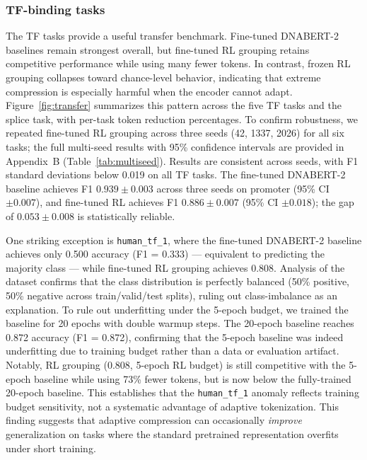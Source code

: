 \documentclass[sigconf,screen]{acmart}
\newcommand{\dnabert}{DNABERT-2\xspace}
\begin{document}
\subsubsection{TF-binding tasks}
The TF tasks provide a useful transfer benchmark. Fine-tuned \dnabert baselines remain strongest overall, but fine-tuned RL grouping retains competitive performance while using many fewer tokens. In contrast, frozen RL grouping collapses toward chance-level behavior, indicating that extreme compression is especially harmful when the encoder cannot adapt. Figure~\ref{fig:transfer} summarizes this pattern across the five TF tasks and the splice task, with per-task token reduction percentages. To confirm robustness, we repeated fine-tuned RL grouping across three seeds (42, 1337, 2026) for all six tasks; the full multi-seed results with 95\% confidence intervals are provided in Appendix~B (Table~\ref{tab:multiseed}). Results are consistent across seeds, with F1 standard deviations below 0.019 on all TF tasks. The fine-tuned \dnabert baseline achieves F1 $0.939\pm0.003$ across three seeds on promoter (95\% CI $\pm0.007$), and fine-tuned RL achieves F1 $0.886\pm0.007$ (95\% CI $\pm0.018$); the gap of $0.053\pm0.008$ is statistically reliable.

One striking exception is \texttt{human\_tf\_1}, where the fine-tuned \dnabert baseline achieves only 0.500 accuracy (F1 = 0.333) — equivalent to predicting the majority class — while fine-tuned RL grouping achieves 0.808. Analysis of the dataset confirms that the class distribution is perfectly balanced (50\% positive, 50\% negative across train/valid/test splits), ruling out class-imbalance as an explanation. To rule out underfitting under the 5-epoch budget, we trained the baseline for 20 epochs with double warmup steps. The 20-epoch baseline reaches 0.872 accuracy (F1 = 0.872), confirming that the 5-epoch baseline was indeed underfitting due to training budget rather than a data or evaluation artifact. Notably, RL grouping (0.808, 5-epoch RL budget) is still competitive with the 5-epoch baseline while using 73\% fewer tokens, but is now below the fully-trained 20-epoch baseline. This establishes that the \texttt{human\_tf\_1} anomaly reflects training budget sensitivity, not a systematic advantage of adaptive tokenization. This finding suggests that adaptive compression can occasionally \emph{improve} generalization on tasks where the standard pretrained representation overfits under short training.
\end{document}
